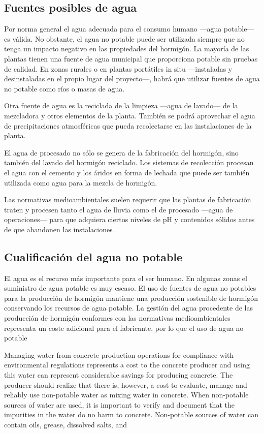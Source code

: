 \subsection{Fuentes posibles de agua}

Por norma general el agua adecuada para el consumo humano —agua potable— es válida. No obstante, el agua no potable puede ser utilizada siempre que no tenga un impacto negativo en las propiedades del hormigón. La mayoría de las plantas tienen una fuente de agua municipal que proporciona potable sin pruebas de calidad. En zonas rurales o en plantas portátiles in situ —instaladas y desinstaladas en el propio lugar del proyecto—, habrá que utilizar fuentes de agua no potable como ríos o masas de agua.

Otra fuente de agua es la reciclada de la limpieza —agua de lavado— de la mezcladora y otros elementos de la planta. También se podrá aprovechar el agua de precipitaciones atmosféricas que pueda recolectarse en las instalaciones de la planta.

El agua de procesado no sólo se genera de la fabricación del hormigón, sino también del lavado del hormigón reciclado. Los sistemas de recolección procesan el agua con el cemento y los áridos en forma de lechada que puede ser también utilizada como agua para la mezcla de hormigón.

Las normativas medioambientales suelen requerir que las plantas de fabricación traten y procesen tanto el agua de lluvia como el de procesado —agua de operaciones— para que adquiera ciertos niveles de pH y contenidos sólidos antes de que abandonen las instalaciones \cite{ermco}.

\subsection{Cualificación del agua no potable}
El agua es el recurso más importante para el ser humano. En algunas zonas el suministro de agua potable es muy escaso. El uso de fuentes de agua no potables para la producción de hormigón mantiene una producción sostenible de hormigón conservando los recursos de agua potable. La gestión del agua procedente de las producción de hormigón conformes con las normativas medioambientales representa un coste adicional para el fabricante, por lo que el uso de agua no potable

Managing water from concrete production operations for compliance with environmental regulations represents a cost to the concrete producer and using this water can represent considerable savings for producing concrete. The producer should realize that there is, however, a cost to evaluate, manage and reliably use non-potable water as mixing water in concrete.
When non-potable sources of water are used, it is important to verify and document that the impurities in the water do no harm to concrete. Non-potable sources of water can contain oils, grease, dissolved salts, and


